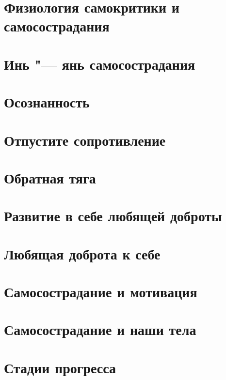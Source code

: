 \documentclass[a4paper,12pt]{article}
\begin{document}



\tableofcontents
\newpage








\section{Физиология самокритики и самосострадания}
\section{Инь "--- янь самосострадания }
\section{Осознанность}
\section{Отпустите сопротивление}
\section{Обратная тяга}
\section{Развитие в себе любящей доброты}
\section{Любящая доброта к себе}
\section{Самосострадание и мотивация} \label{Self-Compassionate_Motivation}
\section{Самосострадание и наши тела}
\section{Стадии прогресса}
\end{document}
